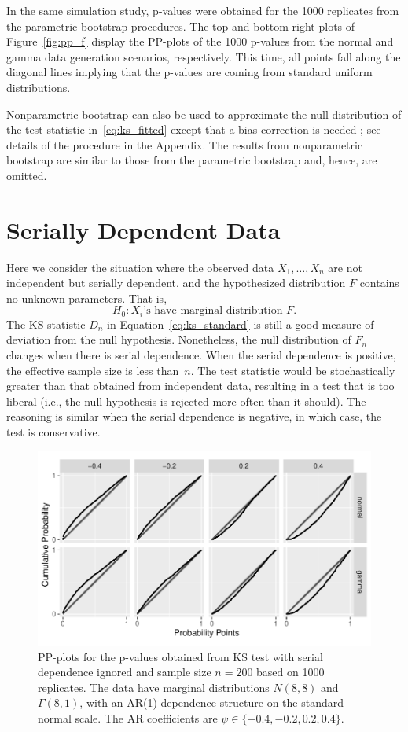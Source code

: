 \documentclass[12pt, letterpaper]{article}
\begin{document}
In the same simulation study, p-values were obtained for the 1000 replicates
from the parametric bootstrap procedures. The top and bottom right plots of 
Figure~\ref{fig:pp_f} display the PP-plots of the 1000
p-values from the normal and gamma data generation scenarios,
respectively. This time, all points fall along the diagonal lines implying that
the p-values are coming from standard uniform distributions.


Nonparametric bootstrap can also be used to approximate the null distribution
of the test statistic in~\eqref{eq:ks_fitted} except that a bias correction is 
needed \citep{babu2004goodness}; see details of the procedure
in the Appendix. The results from nonparametric bootstrap are similar to those
from the parametric bootstrap and, hence, are omitted.


\section{Serially Dependent Data}
\label{sec:dependence}

Here we consider the situation where the observed data $X_1, \ldots, X_n$ are
not independent but serially dependent, and the hypothesized distribution $F$
contains no unknown parameters. That is,
\[
H_0: \text{$X_i$'s have marginal distribution $F$.}
\]
The KS statistic $D_n$ in Equation~\eqref{eq:ks_standard}
is still a good measure of deviation from the null hypothesis. Nonetheless, the
null distribution of $F_n$ changes when there is serial dependence.
When the serial dependence is
positive, the effective sample size is less than~$n$. The test statistic
would be stochastically greater than that obtained from independent data, 
resulting in a test that is too liberal (i.e., the null hypothesis is rejected
more often than it should). The reasoning is similar when the serial dependence 
is negative, in which case, the test is conservative.


\begin{figure}[tbp]
  \centering
  \includegraphics[width=\textwidth]{pp_s.pdf}
  \caption{PP-plots for the p-values obtained from KS test with serial
    dependence ignored and sample size $n = 200$ based on 1000
    replicates. The data have marginal distributions $N(8, 8)$ and
    $\Gamma(8, 1)$, with an AR(1) dependence structure on the standard normal
    scale. The AR coefficients are $\psi \in \{-0.4, -0.2,  0.2,  0.4\}$.
  }
  \label{fig:pp_s}
\end{figure}
\end{document}
